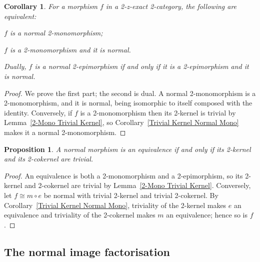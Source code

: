 \documentclass[reqno,a4paper]{amsart}
\numberwithin{equation}{section}
\theoremstyle{plain}
\newtheorem{proposition}[subsection]{Proposition}
\newtheorem{corollary}[subsection]{Corollary}
\theoremstyle{definition}
\def\nameit#1{\textrm{#1}~}
\def\corx{\nameit{Corollary}}
\def\lemx{\nameit{Lemma}}
\newcommand{\comp}{\circ}
\newcommand{\iso}{\cong}
\renewcommand{\1}{\onecat{1}}
\begin{document}
\begin{corollary}\label{Normal Mono Criterion}
	For a morphism \(f\) in a 2-z-exact 2-category, the following are equivalent:
	\begin{tfae}
		\item \(f\) is a normal 2-monomorphism;
		\item \(f\) is a 2-monomorphism and it is normal.
	\end{tfae}
	Dually, \(f\) is a normal 2-epimorphism if and only if it is a 2-epimorphism and it is normal.
\end{corollary}
\begin{proof}
	We prove the first part; the second is dual. A normal 2-monomorphism is a 2-monomorphism, and it is normal, being isomorphic to itself composed with the identity. Conversely, if \(f\) is a 2-monomorphism then its 2-kernel is trivial by \lemx\ref{2-Mono Trivial Kernel}, so \corx\ref{Trivial Kernel Normal Mono} makes it a normal 2-monomorphism.
\end{proof}

\begin{proposition}\label{Normal Equivalence Trivial}
	A normal morphism is an equivalence if and only if its 2-kernel and its 2-cokernel are trivial.
\end{proposition}
\begin{proof}
	An equivalence is both a 2-monomorphism and a 2-epimorphism, so its 2-kernel and 2-cokernel are trivial by \lemx\ref{2-Mono Trivial Kernel}. Conversely, let \(f\iso m\comp e\) be normal with trivial 2-kernel and trivial 2-cokernel. By \corx\ref{Trivial Kernel Normal Mono}, triviality of the 2-kernel makes \(e\) an equivalence and triviality of the 2-cokernel makes \(m\) an equivalence; hence so is \(f\).
\end{proof}

\subsection{The normal image factorisation}\label{SS:ImageFactorisation}
\end{document}
